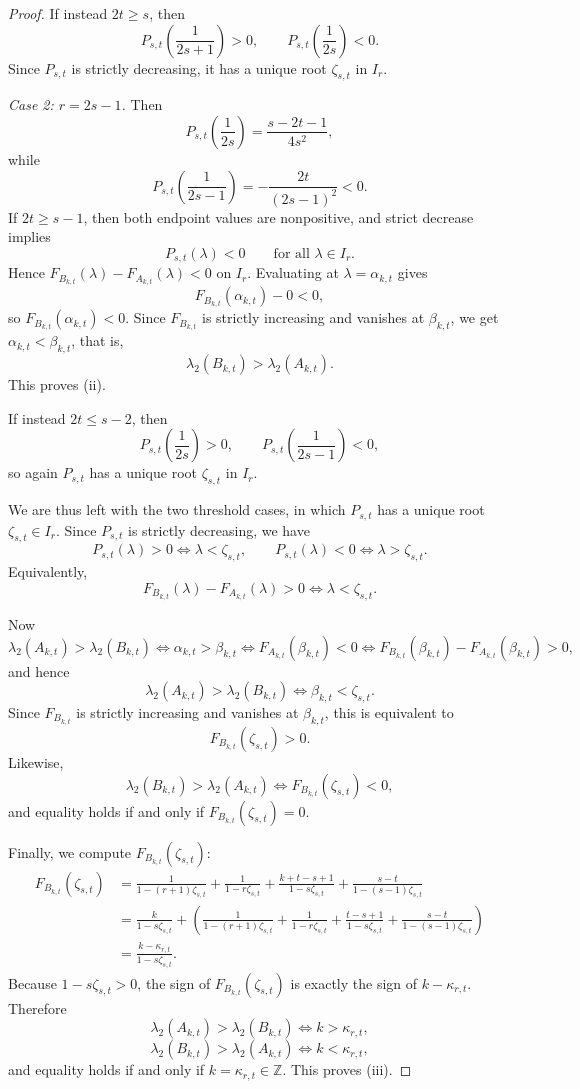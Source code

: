 \documentclass[10pt,a4paper]{amsart}
\begin{document}
\begin{proof}
If instead $2t\ge s$, then
$$
P_{s,t}\!\left(\frac1{2s+1}\right)>0,
\qquad
P_{s,t}\!\left(\frac1{2s}\right)<0.
$$
Since $P_{s,t}$ is strictly decreasing, it has a unique root $\zeta_{s,t}$ in $I_r$.

\medskip
\noindent
{\it Case 2: $r=2s-1$.}
Then
$$
P_{s,t}\!\left(\frac1{2s}\right)=\frac{s-2t-1}{4s^2},
$$
while
$$
P_{s,t}\!\left(\frac1{2s-1}\right)= -\frac{2t}{(2s-1)^2}<0.
$$
If $2t\ge s-1$, then both endpoint values are nonpositive, and strict decrease implies
$$
P_{s,t}(\lambda)<0\qquad \text{for all }\lambda\in I_r.
$$
Hence $F_{B_{k,t}}(\lambda)-F_{A_{k,t}}(\lambda)<0$ on $I_r$.
Evaluating at $\lambda=\alpha_{k,t}$ gives
$$
F_{B_{k,t}}(\alpha_{k,t})-0<0,
$$
so $F_{B_{k,t}}(\alpha_{k,t})<0$.
Since $F_{B_{k,t}}$ is strictly increasing and vanishes at $\beta_{k,t}$, we get $\alpha_{k,t}<\beta_{k,t}$, that is,
$$
\lambda_2(B_{k,t})>\lambda_2(A_{k,t}).
$$
This proves \textnormal{(ii)}.

If instead $2t\le s-2$, then
$$
P_{s,t}\!\left(\frac1{2s}\right)>0,
\qquad
P_{s,t}\!\left(\frac1{2s-1}\right)<0,
$$
so again $P_{s,t}$ has a unique root $\zeta_{s,t}$ in $I_r$.

\medskip
We are thus left with the two threshold cases, in which $P_{s,t}$ has a unique root $\zeta_{s,t}\in I_r$.
Since $P_{s,t}$ is strictly decreasing, we have
$$
P_{s,t}(\lambda)>0\iff \lambda<\zeta_{s,t},
\qquad
P_{s,t}(\lambda)<0\iff \lambda>\zeta_{s,t}.
$$
Equivalently,
$$
F_{B_{k,t}}(\lambda)-F_{A_{k,t}}(\lambda)>0\iff \lambda<\zeta_{s,t}.
$$

Now
$$
\lambda_2(A_{k,t})>\lambda_2(B_{k,t})
\iff \alpha_{k,t}>\beta_{k,t}
\iff F_{A_{k,t}}(\beta_{k,t})<0
\iff F_{B_{k,t}}(\beta_{k,t})-F_{A_{k,t}}(\beta_{k,t})>0,
$$
and hence
$$
\lambda_2(A_{k,t})>\lambda_2(B_{k,t})\iff \beta_{k,t}<\zeta_{s,t}.
$$
Since $F_{B_{k,t}}$ is strictly increasing and vanishes at $\beta_{k,t}$, this is equivalent to
$$
F_{B_{k,t}}(\zeta_{s,t})>0.
$$
Likewise,
$$
\lambda_2(B_{k,t})>\lambda_2(A_{k,t})\iff F_{B_{k,t}}(\zeta_{s,t})<0,
$$
and equality holds if and only if $F_{B_{k,t}}(\zeta_{s,t})=0$.

Finally, we compute $F_{B_{k,t}}(\zeta_{s,t})$:
\begin{align*}
F_{B_{k,t}}(\zeta_{s,t})
&=
\frac{1}{1-(r+1)\zeta_{s,t}}
+\frac{1}{1-r\zeta_{s,t}}
+\frac{k+t-s+1}{1-s\zeta_{s,t}}
+\frac{s-t}{1-(s-1)\zeta_{s,t}}\\
&=
\frac{k}{1-s\zeta_{s,t}}
+\left(
\frac{1}{1-(r+1)\zeta_{s,t}}
+\frac{1}{1-r\zeta_{s,t}}
+\frac{t-s+1}{1-s\zeta_{s,t}}
+\frac{s-t}{1-(s-1)\zeta_{s,t}}
\right)\\
&=
\frac{k-\kappa_{r,t}}{1-s\zeta_{s,t}}.
\end{align*}
Because $1-s\zeta_{s,t}>0$, the sign of $F_{B_{k,t}}(\zeta_{s,t})$ is exactly the sign of $k-\kappa_{r,t}$.
Therefore
$$
\lambda_2(A_{k,t})>\lambda_2(B_{k,t})\iff k>\kappa_{r,t},
$$
$$
\lambda_2(B_{k,t})>\lambda_2(A_{k,t})\iff k<\kappa_{r,t},
$$
and equality holds if and only if $k=\kappa_{r,t}\in\mathbb Z$.
This proves \textnormal{(iii)}.
\end{proof}
\end{document}
